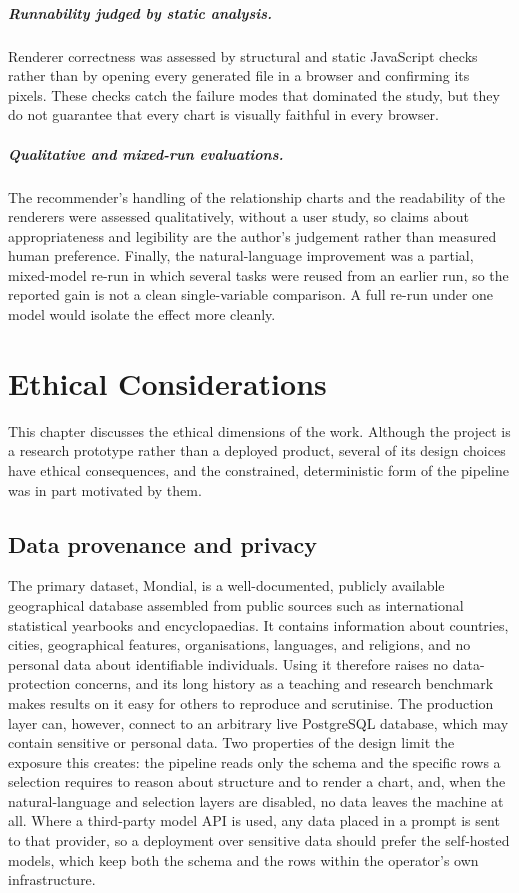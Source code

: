 \paragraph{Runnability judged by static analysis.} Renderer correctness was assessed by structural and static JavaScript checks rather than by opening every generated file in a browser and confirming its pixels. These checks catch the failure modes that dominated the study, but they do not guarantee that every chart is visually faithful in every browser.

\paragraph{Qualitative and mixed-run evaluations.} The recommender's handling of the relationship charts and the readability of the renderers were assessed qualitatively, without a user study, so claims about appropriateness and legibility are the author's judgement rather than measured human preference. Finally, the natural-language improvement was a partial, mixed-model re-run in which several tasks were reused from an earlier run, so the reported gain is not a clean single-variable comparison. A full re-run under one model would isolate the effect more cleanly.


\chapter{Ethical Considerations}
\label{ch:ethics}

This chapter discusses the ethical dimensions of the work. Although the project is a research prototype rather than a deployed product, several of its design choices have ethical consequences, and the constrained, deterministic form of the pipeline was in part motivated by them.

\section{Data provenance and privacy}

The primary dataset, Mondial, is a well-documented, publicly available geographical database assembled from public sources such as international statistical yearbooks and encyclopaedias. It contains information about countries, cities, geographical features, organisations, languages, and religions, and no personal data about identifiable individuals. Using it therefore raises no data-protection concerns, and its long history as a teaching and research benchmark makes results on it easy for others to reproduce and scrutinise. The production layer can, however, connect to an arbitrary live PostgreSQL database, which may contain sensitive or personal data. Two properties of the design limit the exposure this creates: the pipeline reads only the schema and the specific rows a selection requires to reason about structure and to render a chart, and, when the natural-language and selection layers are disabled, no data leaves the machine at all. Where a third-party model API is used, any data placed in a prompt is sent to that provider, so a deployment over sensitive data should prefer the self-hosted models, which keep both the schema and the rows within the operator's own infrastructure.

